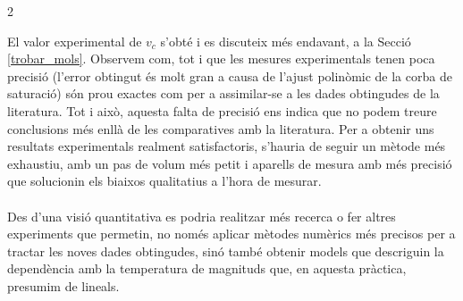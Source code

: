 \documentclass[12pt,twosides,onecolumn,openany]{article}
\newenvironment{Figura}
  {\par\medskip\noindent\minipage{\linewidth}}
  {\endminipage\par\medskip}
\begin{document}
\begin{multicols}{2}
\renewcommand{\arraystretch}{1.57}
\begin{Figura}
  \centering
  \label{tau:comparacio_Exp}
\end{Figura}
\renewcommand{\arraystretch}{1}
El valor experimental de $v_c$ s'obté i es discuteix més endavant, a la Secció \ref{trobar_mols}. Observem com, tot i que les mesures experimentals tenen poca precisió (l'error obtingut és molt gran a causa de l'ajust polinòmic de la corba de saturació) són prou exactes com per a assimilar-se a les dades obtingudes de la literatura. Tot i això, aquesta falta de precisió ens indica que no podem treure conclusions més enllà de les comparatives amb la literatura. Per a obtenir uns resultats experimentals realment satisfactoris, s'hauria de seguir un mètode més exhaustiu, amb un pas de volum més petit i aparells de mesura amb més precisió que solucionin els biaixos qualitatius a l'hora de mesurar.\\\\
Des d'una visió quantitativa es podria realitzar més recerca o fer altres experiments que permetin, no només aplicar mètodes numèrics més precisos per a tractar les noves dades obtingudes, sinó també obtenir models que descriguin la dependència amb la temperatura de magnituds que, en aquesta pràctica, presumim de lineals.\\\\

\end{multicols}
\end{document}
